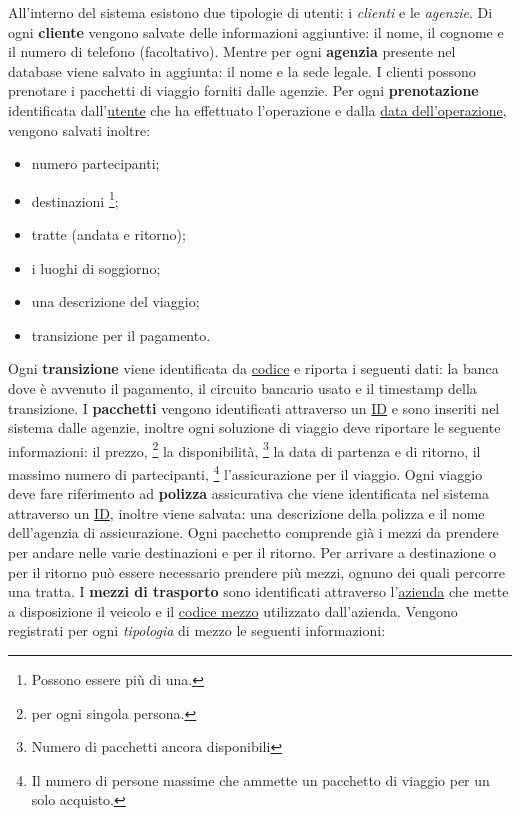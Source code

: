%
%
All'interno del sistema esistono due tipologie di utenti: i \emph{clienti} e le \emph{agenzie}. Di ogni \textbf{cliente} vengono salvate delle informazioni aggiuntive: il nome, il cognome e il numero di telefono (facoltativo). Mentre per ogni \textbf{agenzia} presente nel database viene salvato in aggiunta: il nome e la sede legale.
%
%
I clienti possono prenotare i pacchetti di viaggio forniti dalle agenzie. Per ogni \textbf{prenotazione} identificata dall'\underline{utente} che ha effettuato l'operazione e dalla \underline{data dell'operazione}, vengono salvati inoltre:
\begin{multicols}{2}
\begin{itemize}
    \item numero partecipanti;
    \item destinazioni \footnote{Possono essere più di una.};
    \item tratte (andata e ritorno);
    \item i luoghi di soggiorno;
    \item una descrizione del viaggio;
    \item transizione per il pagamento.
\end{itemize}
\end{multicols}
%
%
Ogni \textbf{transizione} viene identificata da \underline{codice} e riporta i seguenti dati: la banca dove è avvenuto il pagamento, il circuito bancario usato e il timestamp della transizione.
%
%
I \textbf{pacchetti} vengono identificati attraverso un \underline{ID} e sono inseriti nel sistema dalle agenzie, inoltre ogni soluzione di viaggio deve riportare le seguente informazioni:
il prezzo,
\footnote{per ogni singola persona.}
la disponibilità, \footnote{Numero di pacchetti ancora disponibili}
la data di partenza e di ritorno,
il massimo numero di partecipanti,
\footnote{Il numero di persone massime che ammette un pacchetto di viaggio per un solo acquisto.}
l'assicurazione per il viaggio.
Ogni viaggio deve fare riferimento ad \textbf{polizza} assicurativa che viene identificata nel sistema attraverso un \underline{ID}, inoltre viene salvata: una descrizione della polizza e il nome dell'agenzia di assicurazione.
%
%
Ogni pacchetto comprende già i mezzi da prendere per andare nelle varie destinazioni e per il ritorno. Per arrivare a destinazione o per il ritorno può essere necessario prendere più mezzi, ognuno dei quali percorre una tratta. I \textbf{mezzi di trasporto} sono identificati attraverso l'\underline{azienda} che mette a disposizione il veicolo e il \underline{codice mezzo} utilizzato dall'azienda. Vengono registrati per ogni \emph{tipologia} di mezzo le seguenti informazioni:
